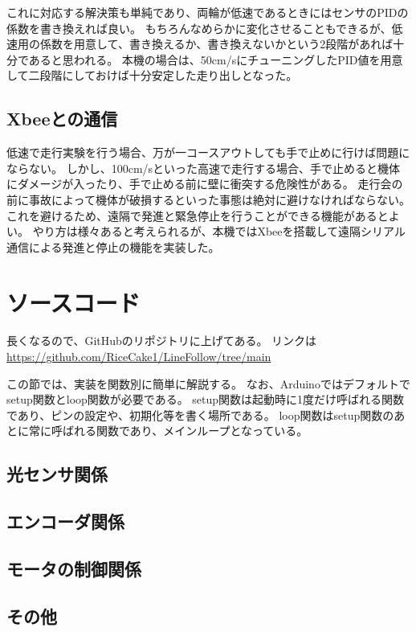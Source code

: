 \documentclass{ltjsreport}
\begin{document}
これに対応する解決策も単純であり、両輪が低速であるときにはセンサのPIDの係数を書き換えれば良い。
もちろんなめらかに変化させることもできるが、低速用の係数を用意して、書き換えるか、書き換えないかという2段階があれば十分であると思われる。
本機の場合は、50cm/sにチューニングしたPID値を用意して二段階にしておけば十分安定した走り出しとなった。

\subsection{Xbeeとの通信}
低速で走行実験を行う場合、万が一コースアウトしても手で止めに行けば問題にならない。
しかし、100cm/sといった高速で走行する場合、手で止めると機体にダメージが入ったり、手で止める前に壁に衝突する危険性がある。
走行会の前に事故によって機体が破損するといった事態は絶対に避けなければならない。
これを避けるため、遠隔で発進と緊急停止を行うことができる機能があるとよい。
やり方は様々あると考えられるが、本機ではXbeeを搭載して遠隔シリアル通信による発進と停止の機能を実装した。


\section{ソースコード}
長くなるので、GitHubのリポジトリに上げてある。
リンクは\url{https://github.com/RiceCake1/LineFollow/tree/main}

この節では、実装を関数別に簡単に解説する。
なお、Arduinoではデフォルトでsetup関数とloop関数が必要である。
setup関数は起動時に1度だけ呼ばれる関数であり、ピンの設定や、初期化等を書く場所である。
loop関数はsetup関数のあとに常に呼ばれる関数であり、メインループとなっている。
\subsection{光センサ関係}

\subsection{エンコーダ関係}

\subsection{モータの制御関係}

\subsection{その他}
\end{document}
